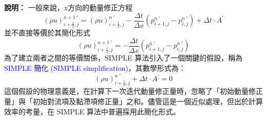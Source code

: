 \documentclass[12pt]{article}
\begin{document}
\noindent \textbf{說明：} 一般來說，x方向的動量修正方程
\begin{equation*}
    (\rho u)_{i+\frac{1}{2},j}^{n+1\ \prime} = (\rho u)_{i+\frac{1}{2},j}^{n\ \prime} - \frac{\Delta t}{\Delta x}(p_{i+1,j}^{n\ \prime} - p_{i,j}^{n\ \prime}) + \Delta t \cdot A^{\prime}
\end{equation*}
並不直接等價於其簡化形式
\begin{equation*}
    (\rho u)_{i+\frac{1}{2},j}^{n+1\ \prime} = - \frac{\Delta t}{\Delta x}(p_{i+1,j}^{n\ \prime} - p_{i,j}^{n\ \prime})
\end{equation*}
為了建立兩者之間的等價關係，SIMPLE 算法引入了一個關鍵的假設，稱為 \textcolor{blue}{SIMPLE 簡化 (SIMPLE simplification)}，其數學形式為：
\begin{equation*}
    (\rho u)_{i+\frac{1}{2},j}^{n\ \prime} + \Delta t \cdot A^{\prime} = 0
\end{equation*}
這個假設的物理意義是，在計算下一次迭代動量修正量時，忽略了「初始動量修正量」與「初始對流項及黏滯項修正量」之和。儘管這是一個近似處理，但出於計算效率的考量，在 SIMPLE 算法中普遍採用此簡化形式。
\end{document}
